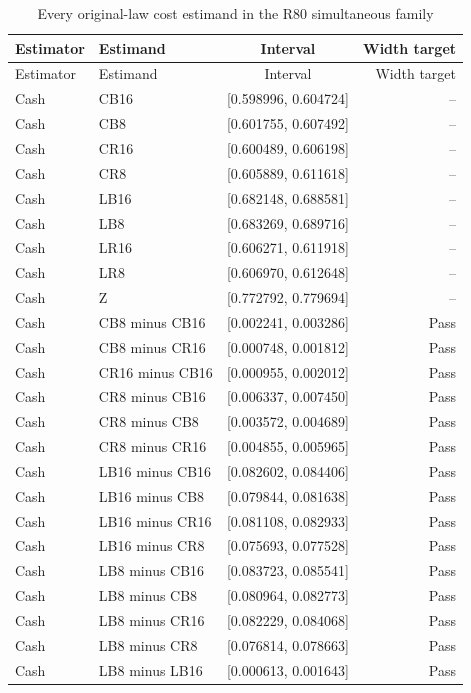 {\small\setlength{\tabcolsep}{4pt}
\begin{longtable}{llcr}
\caption{Every original-law cost estimand in the R80 simultaneous family}\label{tab:all-factorial81}\\
\toprule Estimator & Estimand & Interval & Width target \\\midrule
\endfirsthead
\toprule Estimator & Estimand & Interval & Width target \\\midrule
\endhead
Cash & CB16 & [0.598996, 0.604724] & -- \\
Cash & CB8 & [0.601755, 0.607492] & -- \\
Cash & CR16 & [0.600489, 0.606198] & -- \\
Cash & CR8 & [0.605889, 0.611618] & -- \\
Cash & LB16 & [0.682148, 0.688581] & -- \\
Cash & LB8 & [0.683269, 0.689716] & -- \\
Cash & LR16 & [0.606271, 0.611918] & -- \\
Cash & LR8 & [0.606970, 0.612648] & -- \\
Cash & Z & [0.772792, 0.779694] & -- \\
Cash & CB8 minus CB16 & [0.002241, 0.003286] & Pass \\
Cash & CB8 minus CR16 & [0.000748, 0.001812] & Pass \\
Cash & CR16 minus CB16 & [0.000955, 0.002012] & Pass \\
Cash & CR8 minus CB16 & [0.006337, 0.007450] & Pass \\
Cash & CR8 minus CB8 & [0.003572, 0.004689] & Pass \\
Cash & CR8 minus CR16 & [0.004855, 0.005965] & Pass \\
Cash & LB16 minus CB16 & [0.082602, 0.084406] & Pass \\
Cash & LB16 minus CB8 & [0.079844, 0.081638] & Pass \\
Cash & LB16 minus CR16 & [0.081108, 0.082933] & Pass \\
Cash & LB16 minus CR8 & [0.075693, 0.077528] & Pass \\
Cash & LB8 minus CB16 & [0.083723, 0.085541] & Pass \\
Cash & LB8 minus CB8 & [0.080964, 0.082773] & Pass \\
Cash & LB8 minus CR16 & [0.082229, 0.084068] & Pass \\
Cash & LB8 minus CR8 & [0.076814, 0.078663] & Pass \\
Cash & LB8 minus LB16 & [0.000613, 0.001643] & Pass \\

\end{longtable}}
